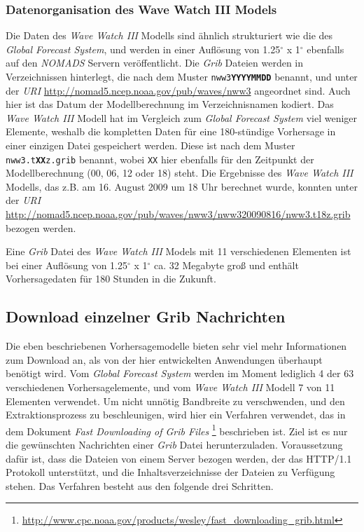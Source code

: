 \subsubsection{Datenorganisation des Wave Watch III Models}
Die Daten des \textit{Wave Watch III} Modells sind ähnlich
strukturiert wie die des \textit{Global Forecast System}, und werden
in einer Auflösung von 1.25$^{\circ}$ x 1$^{\circ}$ ebenfalls auf den
\textit{NOMADS} Servern veröffentlicht. Die \textit{Grib} Dateien
werden in Verzeichnissen hinterlegt, die nach dem Muster
\texttt{nww3\textbf{YYYYMMDD}} benannt, und unter der \textit{URI}
\url{http://nomad5.ncep.noaa.gov/pub/waves/nww3} angeordnet sind. Auch
hier ist das Datum der Modellberechnung im Verzeichnisnamen
kodiert. Das \textit{Wave Watch III} Modell hat im Vergleich zum
\textit{Global Forecast System} viel weniger Elemente, weshalb die
kompletten Daten für eine 180-stündige Vorhersage in einer einzigen
Datei gespeichert werden. Diese ist nach dem Muster
\texttt{nww3.t\textbf{XX}z.grib} benannt, wobei \texttt{XX} hier
ebenfalls für den Zeitpunkt der Modellberechnung (00, 06, 12 oder 18)
steht. Die Ergebnisse des \textit{Wave Watch III} Modells, das z.B. am
16. August 2009 um 18 Uhr berechnet wurde, konnten unter der
\textit{URI}
\url{http://nomad5.ncep.noaa.gov/pub/waves/nww3/nww320090816/nww3.t18z.grib}
bezogen werden.

Eine \textit{Grib} Datei des \textit{Wave Watch III} Models mit 11
verschiedenen Elementen ist bei einer Auflösung von
1.25$^{\circ}$ x 1$^{\circ}$ ca. 32 Megabyte groß und enthält
Vorhersagedaten für 180 Stunden in die Zukunft.

\subsection{Download einzelner Grib Nachrichten}
\label{subsec:download}

Die eben beschriebenen Vorhersagemodelle bieten sehr viel mehr
Informationen zum Download an, als von der hier entwickelten
Anwendungen überhaupt benötigt wird. Vom \textit{Global Forecast
  System} werden im Moment lediglich 4 der 63 verschiedenen
Vorhersagelemente, und vom \textit{Wave Watch III} Modell 7 von 11
Elementen verwendet. Um nicht unnötig Bandbreite zu verschwenden, und
den Extraktionsprozess zu beschleunigen, wird hier ein Verfahren
verwendet, das in dem Dokument \textit{Fast Downloading of Grib Files}
\footnote{\url{http://www.cpc.noaa.gov/products/wesley/fast_downloading_grib.html}}
beschrieben ist. Ziel ist es nur die gewünschten Nachrichten einer
\textit{Grib} Datei herunterzuladen. Voraussetzung dafür ist, dass die
Dateien von einem Server bezogen werden, der das HTTP/1.1 Protokoll
unterstützt, und die Inhaltsverzeichnisse der Dateien zu Verfügung
stehen. Das Verfahren besteht aus den folgende drei Schritten.

